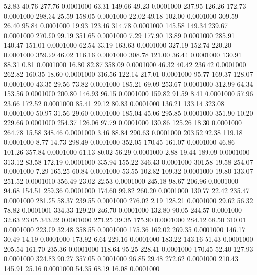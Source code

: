   52.83   40.76  277.76   0.0001000
  63.31  149.66   49.23   0.0001000
 237.95  126.26  172.73   0.0001000
 298.34   25.59  158.05   0.0001000
  22.02   49.18  102.00   0.0001000
 309.59   26.40   95.84   0.0001000
  19.93  123.46  314.78   0.0001000
 145.58  149.34  239.67   0.0001000
 270.90   99.19  351.65   0.0001000
   7.29  177.90   13.89   0.0001000
 285.91  140.47  151.01   0.0001000
  62.54   33.19  163.63   0.0001000
 327.19  152.74  220.20   0.0001000
 359.29   46.02  116.16   0.0001000
 308.78  121.00   36.44   0.0001000
 130.91   88.31    0.81   0.0001000
  16.80   82.87  358.09   0.0001000
  46.32   40.42  236.42   0.0001000
 262.82  160.35   18.60   0.0001000
 316.56  122.14  217.01   0.0001000
  95.77  169.37  128.07   0.0001000
  43.35   29.56   73.82   0.0001000
 185.21   69.09  253.67   0.0001000
 312.99   64.34  153.56   0.0001000
 200.80  146.93   96.15   0.0001000
 159.82   91.59    8.41   0.0001000
  57.96   23.66  172.52   0.0001000
  85.41   29.12   80.83   0.0001000
 136.21  133.14  323.08   0.0001000
  50.97   31.56   29.60   0.0001000
 185.04   45.06  295.85   0.0001000
 351.90   10.20  229.66   0.0001000
 254.37  126.06   97.79   0.0001000
 130.86  125.26   18.30   0.0001000
 264.78   15.58  348.46   0.0001000
   3.46   88.84  290.63   0.0001000
 203.52   92.38  119.18   0.0001000
   8.77   14.73  298.49   0.0001000
 352.05  170.45  161.07   0.0001000
  46.86  101.26  357.84   0.0001000
  61.13   80.02   56.29   0.0001000
   2.88   19.44  189.09   0.0001000
 313.12   83.58  172.19   0.0001000
 335.94  155.22  346.43   0.0001000
 301.58   19.58  254.07   0.0001000
   7.29  165.25   60.84   0.0001000
  53.55  102.82  109.32   0.0001000
  19.80  133.07  251.52   0.0001000
 356.49   23.02   22.53   0.0001000
 245.18   98.67  206.96   0.0001000
  94.68  154.51  259.36   0.0001000
 174.60   99.82  260.20   0.0001000
 130.77   22.42  235.47   0.0001000
 281.25   58.37  239.55   0.0001000
 276.02    2.19  128.21   0.0001000
  29.62   56.32   78.82   0.0001000
 334.33  129.20  246.70   0.0001000
 132.80   90.05  244.57   0.0001000
  32.63   23.05  343.22   0.0001000
 271.25   39.35  175.90   0.0001000
 284.12   68.50  310.01   0.0001000
 223.09   32.48  358.55   0.0001000
 175.36  162.02  269.35   0.0001000
 146.17   30.49   14.19   0.0001000
 173.92    6.64  229.16   0.0001000
 183.22  143.16   51.43   0.0001000
 205.54  161.70  235.36   0.0001000
 118.64   95.25  228.41   0.0001000
 170.45   52.40  127.93   0.0001000
 324.83   90.27  357.05   0.0001000
  96.85   29.48  272.62   0.0001000
 210.43  145.91   25.16   0.0001000
  54.35   68.19   16.08   0.0001000
